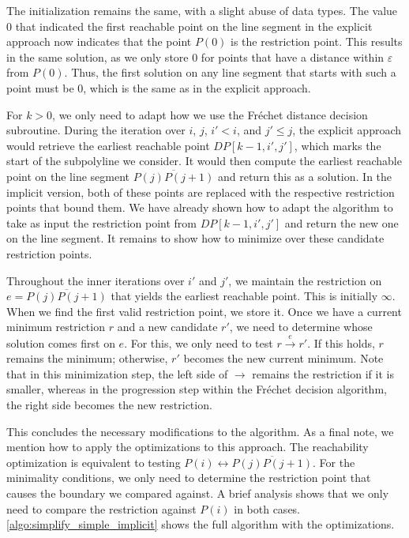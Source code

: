 The initialization remains the same, with a slight abuse of data types. The value \(0\) that indicated the first reachable point on the line segment in the explicit approach now indicates that the point \(P(0)\) is the restriction point. This results in the same solution, as we only store \(0\) for points that have a distance within \(\varepsilon\) from \(P(0)\). Thus, the first solution on any line segment that starts with such a point must be \(0\), which is the same as in the explicit approach.

For \(k > 0\), we only need to adapt how we use the Fréchet distance decision subroutine. During the iteration over \(i\), \(j\), \(i' < i\), and \(j' \leq j\), the explicit approach would retrieve the earliest reachable point \(DP[k-1, i', j']\), which marks the start of the subpolyline we consider. It would then compute the earliest reachable point on the line segment \(\overline{P(j)P(j+1)}\) and return this as a solution. In the implicit version, both of these points are replaced with the respective restriction points that bound them. We have already shown how to adapt the algorithm to take as input the restriction point from \(DP[k-1,i',j']\) and return the new one on the line segment. It remains to show how to minimize over these candidate restriction points.

Throughout the inner iterations over \(i'\) and \(j'\), we maintain the restriction on \(e = \overline{P(j)P(j+1)}\) that yields the earliest reachable point. This is initially \(\infty\). When we find the first valid restriction point, we store it. Once we have a current minimum restriction \(r\) and a new candidate \(r'\), we need to determine whose solution comes first on \(e\). For this, we only need to test \(r \overset e\to r'\). If this holds, \(r\) remains the minimum; otherwise, \(r'\) becomes the new current minimum. Note that in this minimization step, the left side of \(\to\) remains the restriction if it is smaller, whereas in the progression step within the Fréchet decision algorithm, the right side becomes the new restriction.

This concludes the necessary modifications to the algorithm. As a final note, we mention how to apply the optimizations to this approach. The reachability optimization is equivalent to testing \(P(i) \leftrightarrow \overline{P(j)P(j+1)}\). For the minimality conditions, we only need to determine the restriction point that causes the boundary we compared against. A brief analysis shows that we only need to compare the restriction against \(P(i)\) in both cases. \cref{algo:simplify_simple_implicit} shows the full algorithm with the optimizations.

